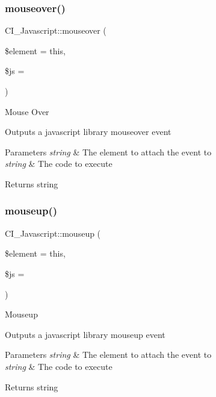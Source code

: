 \subsubsection{\texorpdfstring{mouseover()}{mouseover()}}
{\footnotesize\ttfamily C\+I\+\_\+\+Javascript\+::mouseover (\begin{DoxyParamCaption}\item[{}]{\$element = {\ttfamily \textquotesingle{}this\textquotesingle{}},  }\item[{}]{\$js = {\ttfamily \textquotesingle{}\textquotesingle{}} }\end{DoxyParamCaption})}

Mouse Over

Outputs a javascript library mouseover event


\begin{DoxyParams}{Parameters}
{\em string} & The element to attach the event to \\
\hline
{\em string} & The code to execute \\
\hline
\end{DoxyParams}
\begin{DoxyReturn}{Returns}
string 
\end{DoxyReturn}
\mbox{\label{class_c_i___javascript_a6eea55e5b64f7b74ff550c45e6ebabe1}} 
\subsubsection{\texorpdfstring{mouseup()}{mouseup()}}
{\footnotesize\ttfamily C\+I\+\_\+\+Javascript\+::mouseup (\begin{DoxyParamCaption}\item[{}]{\$element = {\ttfamily \textquotesingle{}this\textquotesingle{}},  }\item[{}]{\$js = {\ttfamily \textquotesingle{}\textquotesingle{}} }\end{DoxyParamCaption})}

Mouseup

Outputs a javascript library mouseup event


\begin{DoxyParams}{Parameters}
{\em string} & The element to attach the event to \\
\hline
{\em string} & The code to execute \\
\hline
\end{DoxyParams}
\begin{DoxyReturn}{Returns}
string 
\end{DoxyReturn}
\mbox{\label{class_c_i___javascript_a95de084a2a79ab6d373b6a28b3978f05}} 
